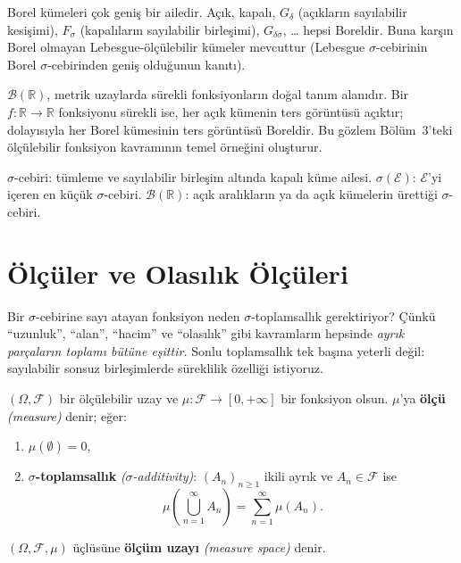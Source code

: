 \begin{notkutu}
Borel kümeleri çok geniş bir ailedir. Açık, kapalı, $G_\delta$ (açıkların sayılabilir
kesişimi), $F_\sigma$ (kapalıların sayılabilir birleşimi), $G_{\delta\sigma}$, \ldots
hepsi Boreldir. Buna karşın Borel olmayan Lebesgue-ölçülebilir kümeler
mevcuttur (Lebesgue $\sigma$-cebirinin Borel $\sigma$-cebirinden geniş olduğunun kanıtı).
\end{notkutu}

\begin{disiplinlerarasibaglan}
$\mathcal{B}(\mathbb{R})$, metrik uzaylarda sürekli fonksiyonların doğal
tanım alanıdır. Bir $f: \mathbb{R} \to \mathbb{R}$ fonksiyonu sürekli ise,
her açık kümenin ters görüntüsü açıktır; dolayısıyla her Borel kümesinin
ters görüntüsü Boreldir. Bu gözlem Bölüm~3'teki ölçülebilir fonksiyon
kavramının temel örneğini oluşturur.
\end{disiplinlerarasibaglan}

\begin{mikroozet}[§1.1 özeti]
$\sigma$-cebiri: tümleme ve sayılabilir birleşim altında kapalı küme ailesi.
$\sigma(\mathcal{E})$: $\mathcal{E}$'yi içeren en küçük $\sigma$-cebiri.
$\mathcal{B}(\mathbb{R})$: açık aralıkların ya da açık kümelerin ürettiği $\sigma$-cebiri.
\end{mikroozet}


\section{Ölçüler ve Olasılık Ölçüleri}

\begin{tanimgerekce}
Bir $\sigma$-cebirine sayı atayan fonksiyon neden $\sigma$-toplamsallık
gerektiriyor? Çünkü ``uzunluk'', ``alan'', ``hacim'' ve ``olasılık'' gibi
kavramların hepsinde \emph{ayrık parçaların toplamı bütüne eşittir.} Sonlu
toplamsallık tek başına yeterli değil: sayılabilir sonsuz birleşimlerde
süreklilik özelliği istiyoruz.
\end{tanimgerekce}

\begin{tanim}[Ölçü]\label{def:olcu}
$(\Omega, \mathcal{F})$ bir ölçülebilir uzay ve
$\mu: \mathcal{F} \to [0,+\infty]$ bir fonksiyon olsun.
$\mu$'ya \textbf{ölçü} \emph{(measure)} denir; eğer:
\begin{enumerate}[label=\textbf{(\Alph*)}]
  \item $\mu(\emptyset) = 0$,
  \item \textbf{$\sigma$-toplamsallık} \emph{($\sigma$-additivity)}: $(A_n)_{n \geq 1}$
        ikili ayrık ve $A_n \in \mathcal{F}$ ise
        \[
          \mu\!\left(\bigcup_{n=1}^\infty A_n\right) = \sum_{n=1}^\infty \mu(A_n).
        \]
\end{enumerate}
$(\Omega, \mathcal{F}, \mu)$ üçlüsüne \textbf{ölçüm uzayı} \emph{(measure space)} denir.
\end{tanim}

